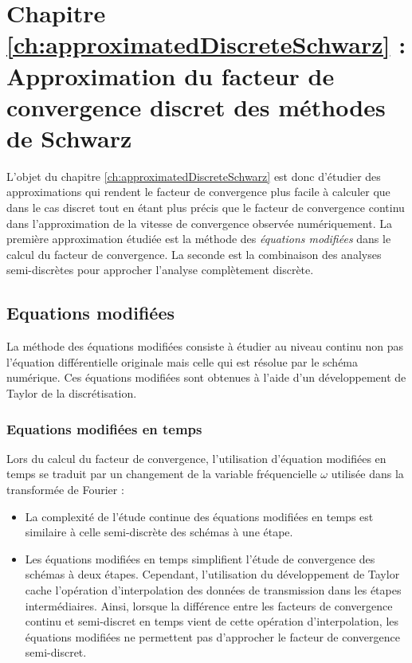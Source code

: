 \section*{Chapitre \ref{ch:approximatedDiscreteSchwarz} : Approximation du facteur de convergence discret des méthodes de Schwarz}
 L'objet du chapitre \ref{ch:approximatedDiscreteSchwarz} est donc d'étudier des approximations
qui rendent le facteur de convergence plus facile à calculer
que dans le cas discret tout en étant plus précis que le facteur
de convergence continu dans l'approximation de la vitesse
de convergence observée numériquement.
La première approximation étudiée est la méthode des
\textit{équations modifiées} dans le calcul du facteur de convergence.
La seconde est la combinaison des analyses semi-discrètes
pour approcher l'analyse complètement discrète.
\subsection*{Equations modifiées}
La méthode des équations modifiées consiste à étudier au niveau
continu non pas l'équation différentielle originale mais celle
qui est résolue par le schéma numérique.
Ces équations modifiées sont obtenues à l'aide d'un développement
de Taylor de la discrétisation.
\subsubsection*{Equations modifiées en temps}
Lors du calcul du facteur de convergence, l'utilisation d'équation
modifiées en temps se traduit par un changement de la variable
fréquencielle $\omega$ utilisée dans la transformée de Fourier :
\begin{itemize}
	\item
La complexité de l'étude continue des équations modifiées en temps
est similaire à celle semi-discrète des schémas à une étape.
	\item
Les équations modifiées en temps simplifient l'étude de convergence
des schémas à deux étapes. Cependant, l'utilisation du développement
de Taylor cache l'opération d'interpolation des données de
transmission dans les étapes intermédiaires. Ainsi, lorsque la
différence entre les facteurs de convergence continu
et semi-discret en temps vient de cette opération d'interpolation,
les équations modifiées ne permettent pas d'approcher le facteur
de convergence semi-discret.
\end{itemize}

